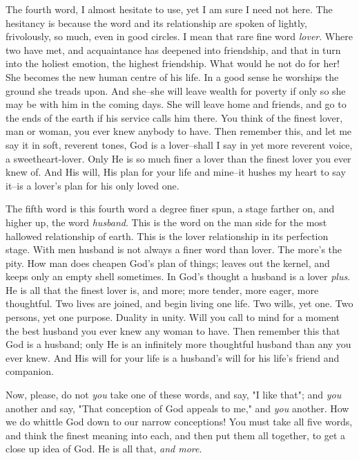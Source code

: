 The fourth word, I almost hesitate to use, yet I am sure I need not here.
The hesitancy is because the word and its relationship are spoken of
lightly, frivolously, so much, even in good circles. I mean that rare fine
word \textit{lover}. Where two have met, and acquaintance has deepened into
friendship, and that in turn into the holiest emotion, the highest
friendship. What would he not do for her! She becomes the new human centre
of his life. In a good sense he worships the ground she treads upon. And
she--she will leave wealth for poverty if only so she may be with him in
the coming days. She will leave home and friends, and go to the ends of
the earth if his service calls him there. You think of the finest lover,
man or woman, you ever knew anybody to have. Then remember this, and let
me say it in soft, reverent tones, God is a lover--shall I say in yet more
reverent voice, a sweetheart-lover. Only He is so much finer a lover than
the finest lover you ever knew of. And His will, His plan for your life
and mine--it hushes my heart to say it--is a lover's plan for his only
loved one.

The fifth word is this fourth word a degree finer spun, a stage farther
on, and higher up, the word \textit{husband}. This is the word on the man side
for the most hallowed relationship of earth. This is the lover
relationship in its perfection stage. With men husband is not always a
finer word than lover. The more's the pity. How man does cheapen God's
plan of things; leaves out the kernel, and keeps only an empty shell
sometimes. In God's thought a husband is a lover \textit{plus}. He is all that
the finest lover is, and more; more tender, more eager, more thoughtful.
Two lives are joined, and begin living one life. Two wills, yet one. Two
persons, yet one purpose. Duality in unity. Will you call to mind for a
moment the best husband you ever knew any woman to have. Then remember
this that God is a husband; only He is an infinitely more thoughtful
husband than any you ever knew. And His will for your life is a husband's
will for his life's friend and companion.

Now, please, do not \textit{you} take one of these words, and say, "I like that";
and \textit{you} another and say, "That conception of God appeals to me," and
\textit{you} another. How we do whittle God down to our narrow conceptions! You
must take all five words, and think the finest meaning into each, and then
put them all together, to get a close up idea of God. He is all that, \textit{and
more}.

